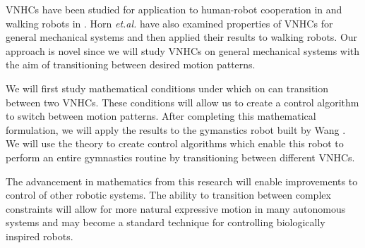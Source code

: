 \documentclass[a4paper,12pt]{article}
\begin{document}
VNHCs have been studied for application to human-robot cooperation in
\cite{vnhc-human-robot-coop} and walking robots in \cite{vnhc-biped-robot}. Horn
\textit{et.al.} have also examined properties of VNHCs for general mechanical
systems \cite{hybrid_zero_dynamics_bipedal_nhvcs} and then applied their results
to walking robots. Our approach is novel since we will study VNHCs on general
mechanical systems with the aim of transitioning between desired motion patterns.

We will first study mathematical conditions under which on can transition
between two VNHCs. These conditions will allow us to create a control algorithm
to switch between motion patterns. After completing this mathematical
formulation, we will apply the results to the gymanstics robot built by Wang
\cite{xingbo-thesis}. We will use the theory to create control algorithms which
enable this robot to perform an entire gymnastics routine by transitioning
between different VNHCs.

The advancement in mathematics from this research will enable improvements to
control of other robotic systems. The ability to transition between complex
constraints will allow for more natural expressive motion in many autonomous
systems and may become a standard technique for controlling biologically
inspired robots.

\printbibliography
\end{document}
